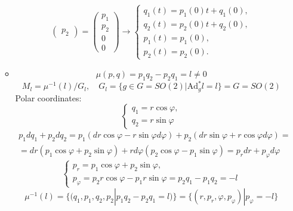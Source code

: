 \documentclass[12pt]{article}
\theoremstyle{definition}
\begin{document}
\begin{enumerate}
\begin{itemize}
\begin{equation}
\begin{pmatrix}
                p_2
            \end{pmatrix}=\begin{pmatrix}
                p_1\\
                p_2\\
                0\\
                0
            \end{pmatrix}\rightarrow\boxed{\begin{cases}
                q_1(t)=p_1(0)t+q_1(0),\\
                q_2(t)=p_2(0)t+q_2(0),\\
                p_1(t)=p_1(0),\\
                p_2(t)=p_2(0).
            \end{cases}}
        \end{equation}
        \item
        \begin{equation}
            \mu(p, q)=p_1q_2-p_2q_1 = l\neq0
        \end{equation}
        \begin{equation}
            M_l=\mu^{-1}(l)/G_l,\quad G_l=\{g\in G=SO(2)|\text{Ad}^*_gl=l\}=G=SO(2)
        \end{equation}
        Polar coordinates:
        \begin{equation}
            \begin{cases}
                q_1=r\cos\varphi,\\
                q_2=r\sin\varphi
            \end{cases}
        \end{equation}
        \begin{multline}
            p_1dq_1+p_2dq_2=p_1(dr\cos\varphi-r\sin\varphi d\varphi)+p_2(dr\sin\varphi+r\cos\varphi d\varphi)=\\=dr(p_1\cos\varphi+p_2\sin\varphi)+rd\varphi(p_2\cos\varphi-p_1\sin\varphi)=p_rdr+p_\varphi d\varphi
        \end{multline}
        \begin{equation}
            \begin{cases}
                p_r=p_1\cos\varphi+p_2\sin\varphi,\\
                p_\varphi=p_2r\cos\varphi-p_1r\sin\varphi=p_2q_1-p_1q_2=-l
            \end{cases}
        \end{equation}
        \begin{equation}
            \mu^{-1}(l)=\{(q_1,p_1,q_2,p_2|p_1q_2-p_2q_1=l)\}=\{(r,p_r,\varphi,p_\varphi)|p_\varphi=-l\}

\end{equation}
\end{itemize}
\end{enumerate}
\end{document}
